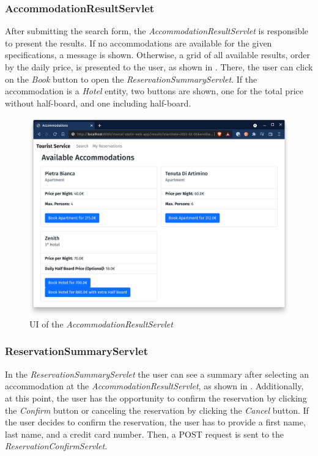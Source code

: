 \subsubsection{AccommodationResultServlet}\label{sec:02_design_web_results}
After submitting the search form, the \textit{AccommodationResultServlet} is responsible to present the results.
If no accommodations are available for the given specifications, a message is shown.
Otherwise, a grid of all available results, order by the daily price, is presented to the user, as shown in . There, the user can click on the \textit{Book} button to open the \textit{ReservationSummaryServlet}. If the accommodation is a \textit{Hotel} entity, two buttons are shown, one for the total price without half-board, and one including half-board.
\begin{figure}[h]
\centering
\includegraphics[scale=0.14]{images/02_design/web-app-results}
\caption{UI of the \textit{AccommodationResultServlet}}
\label{fig:02_design_web_results_page}
\end{figure}

\newpage
\subsubsection{ReservationSummaryServlet}\label{sec:02_design_web_reservationsummary}
In the \textit{ReservationSummaryServlet} the user can see a summary after selecting an accommodation at the \textit{AccommodationResultServlet}, as shown in .
Additionally, at this point, the user has the opportunity to confirm the reservation by clicking the \textit{Confirm} button or canceling the reservation by clicking the \textit{Cancel} button.
If the user decides to confirm the reservation, the user has to provide a first name, last name, and a credit card number. Then, a POST request is sent to the \textit{ReservationConfirmServlet}.


